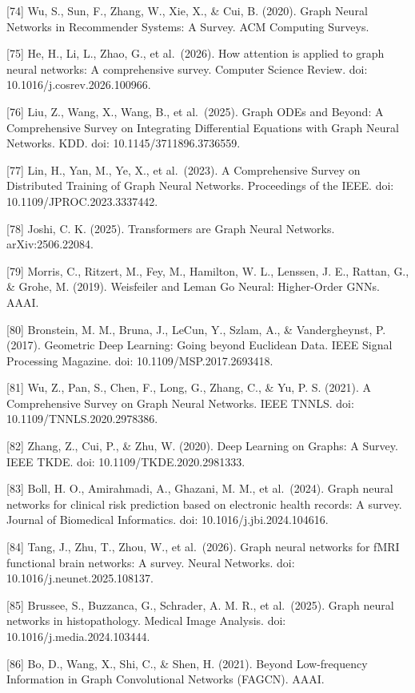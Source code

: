{[}74{]} Wu, S., Sun, F., Zhang, W., Xie, X., \& Cui, B. (2020). Graph Neural Networks in Recommender Systems: A Survey. ACM Computing Surveys.

{[}75{]} He, H., Li, L., Zhao, G., et al.~(2026). How attention is applied to graph neural networks: A comprehensive survey. Computer Science Review. doi: 10.1016/j.cosrev.2026.100966.

{[}76{]} Liu, Z., Wang, X., Wang, B., et al.~(2025). Graph ODEs and Beyond: A Comprehensive Survey on Integrating Differential Equations with Graph Neural Networks. KDD. doi: 10.1145/3711896.3736559.

{[}77{]} Lin, H., Yan, M., Ye, X., et al.~(2023). A Comprehensive Survey on Distributed Training of Graph Neural Networks. Proceedings of the IEEE. doi: 10.1109/JPROC.2023.3337442.

{[}78{]} Joshi, C. K. (2025). Transformers are Graph Neural Networks. arXiv:2506.22084.

{[}79{]} Morris, C., Ritzert, M., Fey, M., Hamilton, W. L., Lenssen, J. E., Rattan, G., \& Grohe, M. (2019). Weisfeiler and Leman Go Neural: Higher-Order GNNs. AAAI.

{[}80{]} Bronstein, M. M., Bruna, J., LeCun, Y., Szlam, A., \& Vandergheynst, P. (2017). Geometric Deep Learning: Going beyond Euclidean Data. IEEE Signal Processing Magazine. doi: 10.1109/MSP.2017.2693418.

{[}81{]} Wu, Z., Pan, S., Chen, F., Long, G., Zhang, C., \& Yu, P. S. (2021). A Comprehensive Survey on Graph Neural Networks. IEEE TNNLS. doi: 10.1109/TNNLS.2020.2978386.

{[}82{]} Zhang, Z., Cui, P., \& Zhu, W. (2020). Deep Learning on Graphs: A Survey. IEEE TKDE. doi: 10.1109/TKDE.2020.2981333.

{[}83{]} Boll, H. O., Amirahmadi, A., Ghazani, M. M., et al.~(2024). Graph neural networks for clinical risk prediction based on electronic health records: A survey. Journal of Biomedical Informatics. doi: 10.1016/j.jbi.2024.104616.

{[}84{]} Tang, J., Zhu, T., Zhou, W., et al.~(2026). Graph neural networks for fMRI functional brain networks: A survey. Neural Networks. doi: 10.1016/j.neunet.2025.108137.

{[}85{]} Brussee, S., Buzzanca, G., Schrader, A. M. R., et al.~(2025). Graph neural networks in histopathology. Medical Image Analysis. doi: 10.1016/j.media.2024.103444.

{[}86{]} Bo, D., Wang, X., Shi, C., \& Shen, H. (2021). Beyond Low-frequency Information in Graph Convolutional Networks (FAGCN). AAAI.

